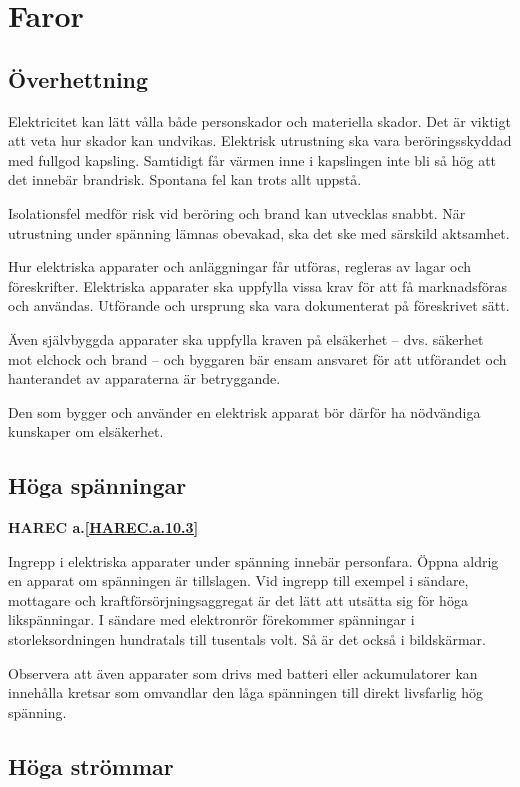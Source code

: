 \section{Faror}

\subsection{Överhettning}

Elektricitet kan lätt vålla både personskador och materiella skador.
Det är viktigt att veta hur skador kan undvikas.
Elektrisk utrustning ska vara beröringsskyddad med fullgod kapsling.
Samtidigt får värmen inne i kapslingen inte bli så hög att det innebär
brandrisk.
Spontana fel kan trots allt uppstå.

Isolationsfel medför risk vid beröring och brand kan utvecklas snabbt.
När utrustning under spänning lämnas obevakad, ska det ske med särskild
aktsamhet.

Hur elektriska apparater och anläggningar får utföras, regleras av
lagar och föreskrifter.
Elektriska apparater ska uppfylla vissa krav för att få marknadsföras och
användas.
Utförande och ursprung ska vara dokumenterat på föreskrivet sätt.

Även självbyggda apparater ska uppfylla kraven på elsäkerhet -- dvs. säkerhet
mot elchock och brand -- och byggaren bär ensam ansvaret för att utförandet och
hanterandet av apparaterna är betryggande.

Den som bygger och använder en elektrisk apparat bör därför ha
nödvändiga kunskaper om elsäkerhet.

\subsection{Höga spänningar}
\textbf{
HAREC a.\ref{HAREC.a.10.3}\label{myHAREC.a.10.3}
}

Ingrepp i elektriska apparater under spänning innebär personfara.
Öppna aldrig en apparat om spänningen är tillslagen.
Vid ingrepp till exempel i sändare, mottagare och kraftförsörjningsaggregat är
det lätt att utsätta sig för höga likspänningar.
I sändare med elektronrör förekommer spänningar i storleksordningen hundratals
till tusentals volt.
Så är det också i bildskärmar.

Observera att även apparater som drivs med batteri eller ackumulatorer kan
innehålla kretsar som omvandlar den låga spänningen till direkt livsfarlig hög
spänning.

\subsection{Höga strömmar}

